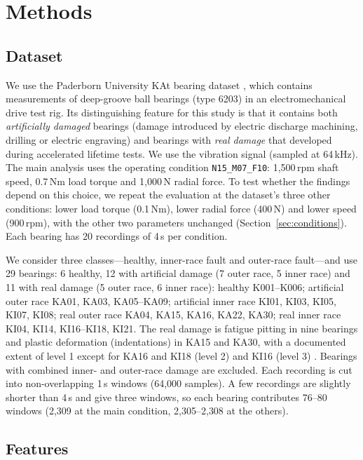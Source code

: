 \section{Methods}
\label{sec:methods}

\subsection{Dataset}

We use the Paderborn University KAt bearing dataset \citep{lessmeier2016,katdatacenter}, which contains measurements
of deep-groove ball bearings (type 6203) in an electromechanical drive test rig. Its distinguishing feature for this study is that
it contains both \emph{artificially damaged} bearings (damage introduced by electric discharge machining, drilling or
electric engraving) and bearings with \emph{real damage} that developed during accelerated lifetime tests. We use the
vibration signal (sampled at 64\,kHz). The main analysis uses the operating condition \texttt{N15\_M07\_F10}:
1{,}500\,rpm shaft speed, 0.7\,Nm load torque and 1{,}000\,N radial force. To test whether the findings depend on
this choice, we repeat the evaluation at the dataset's three other conditions: lower load torque (0.1\,Nm), lower
radial force (400\,N) and lower speed (900\,rpm), with the other two parameters unchanged
(Section~\ref{sec:conditions}). Each bearing has 20 recordings of 4\,s per condition.

We consider three classes---healthy, inner-race fault and outer-race fault---and use 29 bearings: 6 healthy, 12 with
artificial damage (7 outer race, 5 inner race) and 11 with real damage (5 outer race, 6 inner race): healthy
K001--K006; artificial outer race KA01, KA03, KA05--KA09; artificial inner race KI01, KI03, KI05, KI07, KI08; real
outer race KA04, KA15, KA16, KA22, KA30; real inner race KI04, KI14, KI16--KI18, KI21. The real damage is fatigue
pitting in nine bearings and plastic deformation (indentations) in KA15 and KA30, with a documented extent of level 1
except for KA16 and KI18 (level 2) and KI16 (level 3) \citep{lessmeier2016}. Bearings with combined inner-
and outer-race damage are excluded. Each recording is cut into non-overlapping 1\,s windows (64{,}000 samples). A
few recordings are slightly shorter than 4\,s and give three windows, so each bearing contributes 76--80 windows
(2{,}309 at the main condition, 2{,}305--2{,}308 at the others).

\subsection{Features}
\label{sec:features}

